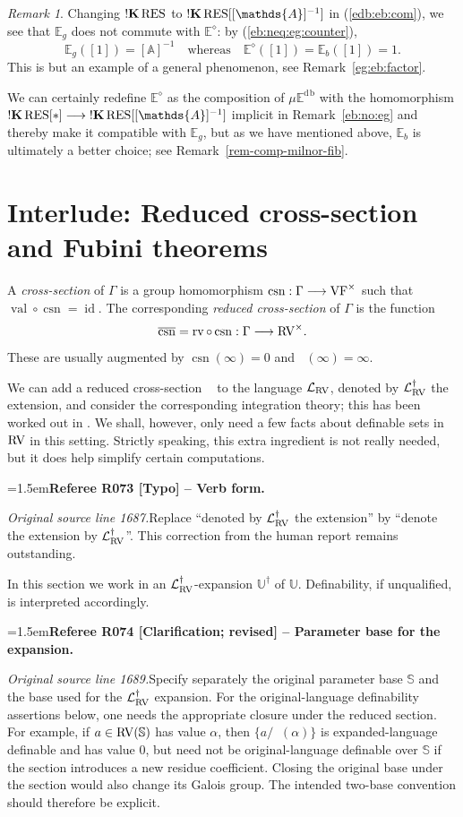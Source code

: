 \documentclass[12pt]{amsart}
\newcommand{\RefereeRemark}[4]{%
  \par\medskip\begingroup\normalfont\small\color{RefereePurple}%
  \emergencystretch=1.5em\noindent\textbf{Referee R#1 [#2] -- #3.}\par\nobreak\noindent #4\par
  \endgroup\medskip
}
\newcommand{\memph}[1]{{\color{magenta}\emph{#1}}}
\theoremstyle{plain}
\theoremstyle{definition}
\theoremstyle{remark}
\newtheorem{rem}[thm]{Remark}
\numberwithin{equation}{section}
\theoremstyle{plain}
\newcommand{\VF}{\textup{VF}}
\newcommand{\RV}{\textup{RV}}
\DeclareMathOperator{\id}{id}
\newcommand{\A}{\mathds{A}}
\newcommand{\0}{\emptyset}
\newcommand{\lan}[3]{\mathcal{L}_{#1 \textup{#2} #3}}
\newcommand{\bb}[1]{\mathbb{#1}}
\newcommand{\fun}{\longrightarrow}
\newcommand{\RES}{\textup{RES}}
\newcommand{\mgE}{{\mu}{\bb E}}
\DeclareMathOperator{\rv}{rv}
\DeclareMathOperator{\csn}{csn}
\DeclareMathOperator{\rcsn}{\overline {csn}}
\DeclareMathOperator{\vv}{val}
\DeclareMathOperator{\sggk}{!\mathbf{K}}
\DeclareMathOperator{\db}{d \! b}
\begin{document}
\begin{rem}\label{eb:not:eg}
Changing $\sggk \RES$ to $\sggk \RES[[\A]^{-1}]$ in (\ref{edb:eb:com}), we see that  $\bb E_g$ does not commute with $\bb E^{\diamond}$: by (\ref{eb:neq:eg:counter}),
\[
\bb E_g([1]) = [\A]^{-1} \quad \text{whereas} \quad \bb E^{\diamond}([1]) = \bb E_b([1]) = 1.
\]
This is but an example of a general phenomenon, see Remark~\ref{eg:eb:factor}.


We can certainly redefine $\bb E^{\diamond}$ as the composition of $\mgE^{\db}$ with  the homomorphism $\sggk \RES[*] \fun \sggk \RES[[\A]^{-1}]$ implicit in Remark~\ref{eb:no:eg} and thereby make it compatible with $\bb E_g$, but as we have mentioned above, $\bb E_b$ is ultimately a better choice; see Remark~\ref{rem-comp-milnor-fib}.
\end{rem}

\section{Interlude: Reduced cross-section and Fubini theorems}\label{csndag}

A \memph{cross-section} of $\Gamma$ is a group homomorphism $\csn : \Gamma \fun \VF^{\times}$ such that $\vv \circ \csn = \id$. The corresponding \memph{reduced cross-section} of $\Gamma$ is the function
\[
\rcsn = \rv \circ \csn : \Gamma \fun \RV^{\times}.
\]
These are usually augmented by $\csn(\infty) = 0$ and $\rcsn(\infty) = \infty$.

We can add a reduced cross-section $\rcsn$ to the language $\lan{}{RV}{}$,  denoted by $\lan{}{RV}{}^\dag$ the extension, and consider the corresponding integration theory; this has been worked out in \cite{Yin:int:expan:acvf}. We shall, however, only need a few facts about definable sets in $\RV$ in this setting. Strictly speaking, this extra ingredient is not really needed, but it does help simplify certain computations.

\RefereeRemark{073}{Typo}{Verb form}{%
\textit{Original source line 1687.}\quad Replace ``denoted by $\lan{}{RV}{}^\dag$ the extension'' by ``denote the extension by $\lan{}{RV}{}^\dag$''. This correction from the human report remains outstanding.
}

In this section we work in an $\lan{}{RV}{}^\dag$-expansion $\bb U^\dag$ of $\bb U$. Definability, if unqualified, is interpreted accordingly.

\RefereeRemark{074}{Clarification; revised}{Parameter base for the expansion}{%
\textit{Original source line 1689.}\quad Specify separately the original parameter base $\mathbb S$ and the base used for the $\lan{}{RV}{}^\dag$ expansion. For the original-language definability assertions below, one needs the appropriate closure under the reduced section. For example, if $a\in\RV(\mathbb S)$ has value $\alpha$, then $\{a/\rcsn(\alpha)\}$ is expanded-language definable and has value $0$, but need not be original-language definable over $\mathbb S$ if the section introduces a new residue coefficient. Closing the original base under the section would also change its Galois group. The intended two-base convention should therefore be explicit.
}
\end{document}
